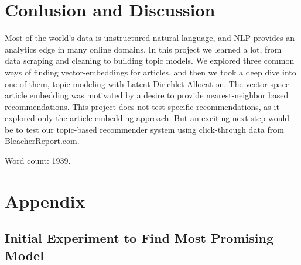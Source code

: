 \documentclass[11pt]{article}
\begin{document}


 
 

\section{Conlusion and Discussion}
Most of the world's data is unstructured natural language, and NLP provides an analytics edge in many online domains.  In this project we learned a lot, from data scraping and cleaning to building topic models. We explored three common ways of finding vector-embeddings for articles, and then we took a deep dive into one of them, topic modeling with Latent Dirichlet Allocation. The vector-space article embedding was motivated by a desire to provide nearest-neighbor based recommendations.  This project does not test specific recommendations, as it explored only the article-embedding approach.  But an exciting next step would be to test our topic-based recommender system using click-through data from BleacherReport.com.

\vspace{25mm}
\hfill Word count: 1939.\hspace{-10mm}

\newpage

\section{Appendix}
\subsection{Initial Experiment to Find Most Promising Model}
\end{document}
